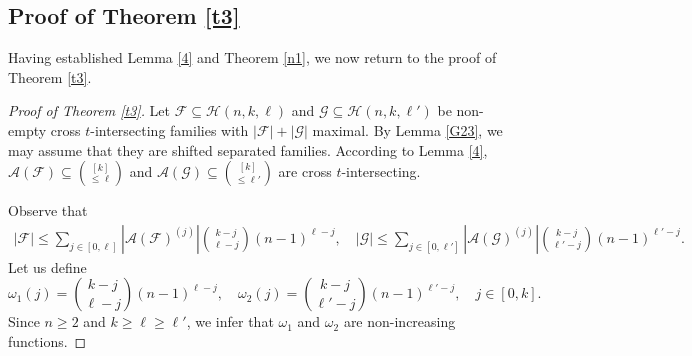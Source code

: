 \documentclass[11pt]{article}
\begin{document}
\subsection{Proof of Theorem \ref{t3}}
Having established Lemma \ref{4} and Theorem \ref{n1}, we now return  to the proof of Theorem \ref{t3}.


 \begin{proof}[Proof of Theorem \ref{t3}]
     Let $\mathcal{F}\subseteq\mathcal{H}(n,k,\ell)$  and  $\mathcal{G}\subseteq\mathcal{H}(n,k,\ell')$ be non-empty cross $t$-intersecting families with $|\mathcal{F}|+|\mathcal{G}| $ maximal. 
     By Lemma \ref{G23}, we may assume that they are shifted 
separated families. 
According to Lemma \ref{4}, $\mathcal{A}(\mathcal{F})\subseteq \binom{[k]}{\le \ell}$ and $\mathcal{A}(\mathcal{G})\subseteq \binom{[k]}{\le \ell'}$ are cross $t$-intersecting. 

Observe that
     \begin{align*}
     |\mathcal{F}|\leq\sum\limits_{j\in[0,\ell]} 
     \left|\mathcal{A}(\mathcal{F})^{(j)}\right|\binom{k-j}{\ell-j}(n-1)^{\ell-j},\quad
|\mathcal{G}|\leq\sum\limits_{j\in[0,\ell']} 
     \left|\mathcal{A}(\mathcal{G})^{(j)}\right|\binom{k-j}{\ell'-j}(n-1)^{\ell'-j}. 
     \end{align*}
Let us define
     $$
     \omega_1{(j)}=\binom{k-j}{\ell-j}(n-1)^{\ell-j},\quad  \omega_2{(j)}=\binom{k-j}{\ell'-j}(n-1)^{\ell'-j},\quad j\in [0,k].
     $$
Since $n\geq 2$ and $k\geq \ell\geq \ell'$, we infer that $ \omega_1$ and $ \omega_2$
are non-increasing functions. 


\end{proof}
\end{document}
